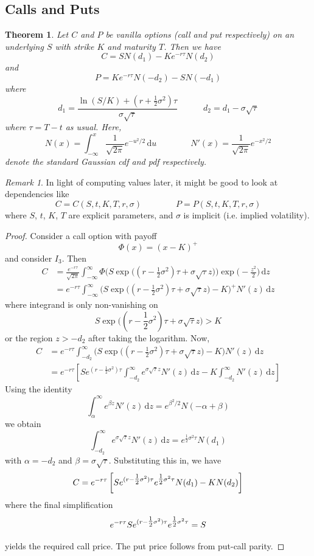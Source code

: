 \documentclass[12pt]{article}
\newtheorem{theorem}{Theorem}
\theoremstyle{definition}
\theoremstyle{remark}
\newtheorem{remark}[lemma]{Remark}
\begin{document}
\subsection{Calls and Puts}
\begin{theorem}
\label{thm: std vanilla option}
	Let $C$ and $P$ be vanilla options (call and put respectively) on an underlying $S$ with strike $K$ and maturity $T$. Then we have
	$$
	C = S N(d_1) - Ke^{-r\tau} N(d_2)
	$$
	and
	$$
	P = Ke^{-r\tau} N(-d_2) - S N(-d_1)
	$$
	where
	$$
	d_1 = \frac{\ln(S/K) + (r + \tfrac12\sigma^2)\tau}{\sigma \sqrt{\tau}}
	\qquad\quad
	d_2 = d_1 - \sigma \sqrt{\tau}
	$$
	where $\tau = T-t$ as usual. Here,
	$$
	N(x) = \int_{-\infty}^x \frac{1}{\sqrt{2\pi}} e^{-u^2/2} \,\mathrm{d}u
	\qquad\qquad
	N'(x) = \frac{1}{\sqrt{2\pi}} e^{-x^2/2}
	$$
	denote the standard Gaussian cdf and pdf respectively.
\end{theorem}
\begin{remark}
\label{rmk: dependencies}
	In light of computing values later, it might be good to look at dependencies like
	$$
	C = C(S,t,K,T,r,\sigma)
	\qquad\qquad
	P = P(S,t,K,T,r,\sigma)
	$$
	where $S$, $t$, $K$, $T$ are explicit parameters, and $\sigma$ is implicit (i.e. implied volatility).
\end{remark}
\begin{proof}
	Consider a call option with payoff
	$$
	\Phi(x) = (x-K)^+
	$$
	and consider $I_3$. Then
	\begin{align*}
		C
		&= \frac{e^{-r\tau}}{\sqrt{2\pi}} \int_{-\infty}^{\infty} \Phi \Big( S \exp \big((r-\frac12\sigma^2)\tau + \sigma\sqrt{\tau} z\big) \Big) \exp \Big( -\frac{z^2}{2} \Big) \,\mathrm{d} z \\
		&= e^{-r\tau} \int_{-\infty}^\infty \Big( S \exp \big((r-\frac12\sigma^2)\tau + \sigma\sqrt{\tau} z\big) - K \Big)^+ N'(z) \,\mathrm{d}z
	\end{align*}
	where integrand is only non-vanishing on
	$$
	S \exp \big((r-\frac12\sigma^2)\tau + \sigma\sqrt{\tau} z\big) > K
	$$
	or the region $z > -d_2$ after taking the logarithm. Now,
	\begin{align*}
		C
		&= e^{-r\tau} \int_{-d_2}^\infty \Big( S \exp \big((r-\frac12\sigma^2)\tau + \sigma\sqrt{\tau} z\big) - K \Big) N'(z) \,\mathrm{d}z \\
		&= e^{-r\tau} \left[ Se^{(r-\tfrac12\sigma^2)\tau} \int_{-d_2}^\infty e^{\sigma\sqrt{\tau}z}N'(z)\,\mathrm{d}z - K\int_{-d_2}^\infty N'(z)\,\mathrm{d}z \right]
	\end{align*}
	Using the identity
	$$
	\int_\alpha^\infty e^{\beta z} N'(z) \,\mathrm{d}z = e^{\beta^2/2} N(-\alpha + \beta)
	$$
	we obtain
	$$
	\int_{-d_2}^\infty e^{\sigma\sqrt{\tau}z}N'(z)\,\mathrm{d}z = e^{\tfrac12\sigma^2\tau} N(d_1)
	$$
	with $\alpha = -d_2$ and $\beta = \sigma\sqrt{\tau}$. Substituting this in, we have
	$$
	\vphantom{\int} C = e^{-r\tau} \left[ S e^{(r-\tfrac12\sigma^2)\tau} e^{\tfrac12\sigma^2\tau} N(d_1) - KN(d_2) \right]
	$$
	where the final simplification
	$$
	\vphantom{\int} e^{-r\tau} S e^{(r-\tfrac12\sigma^2)\tau} e^{\tfrac12\sigma^2\tau} = S
	$$
	yields the required call price. The put price follows from put-call parity.
\end{proof}
\end{document}
